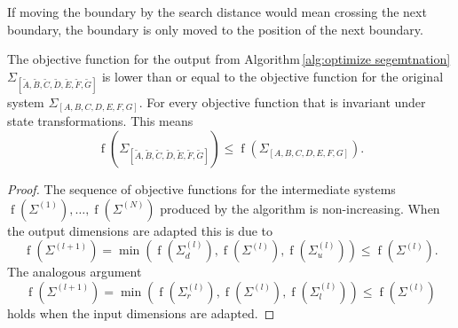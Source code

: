 \documentclass[doctype=mastersthesis,BCOR=15mm,biblatex]{ldvbook}%
\DeclareMathOperator{\f}{f}
\newcommand{\sys}{\Sigma}
\begin{document}
If moving the boundary by the search distance would mean crossing the next boundary, the boundary is only moved to the position of the next boundary.


The objective function for the output from Algorithm\,\ref{alg:optimize segemtnation} $\Sigma_{[\tilde{A},\tilde{B},\tilde{C},\tilde{D},\tilde{E},\tilde{F},\tilde{G}]}$ is lower than or equal to the objective function for the original system $\Sigma_{[A,B,C,D,E,F,G]}$.
For every objective function that is invariant under state transformations.
This means 
\begin{equation}
	\f(\Sigma_{[\tilde{A},\tilde{B},\tilde{C},\tilde{D},\tilde{E},\tilde{F},\tilde{G}]}) \leq \f(\Sigma_{[A,B,C,D,E,F,G]})
	.
\end{equation}
\begin{proof}
	 The sequence of objective functions for the intermediate systems $\f(\sys^{(1)}),\dots,\f(\sys^{(N)})$ produced by the algorithm is non-increasing.
	 When the output dimensions are adapted this is due to  
	\begin{equation}
	\f(\sys^{(l+1)}) = \min(\f(\sys^{(l)}_{d}),\f(\sys^{(l)}),\f(\sys^{(l)}_{u})) \leq \f(\sys^{(l)})
	.
	\end{equation}
	The analogous argument 
	\begin{equation}
	\f(\sys^{(l+1)}) = \min(\f(\sys^{(l)}_{r}),\f(\sys^{(l)}),\f(\sys^{(l)}_{l})) \leq \f(\sys^{(l)})
	\end{equation} 
	holds when the input dimensions are adapted.
\end{proof}
\end{document}
